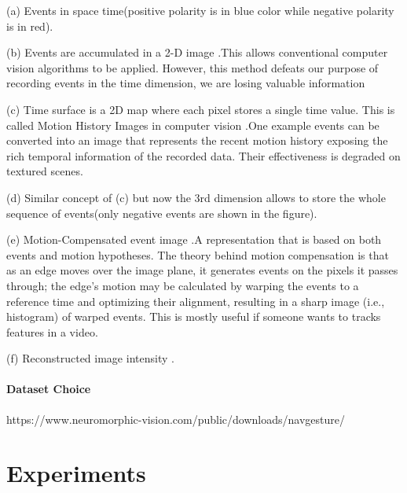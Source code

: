 \documentclass[12pt]{report}
\begin{document}
(a) Events in space time(positive polarity is in blue color while negative polarity is in red).

(b) Events are accumulated in a 2-D image .This allows conventional computer vision algorithms to be applied. However, this method defeats our purpose of recording events in the time dimension, we are losing valuable information

(c) Time surface is a 2D map where each pixel stores a single time value. This is called Motion History Images in computer vision \cite{ahad2012} .One example \cite{lagorge2017} events can be converted into an image that represents the recent motion history exposing the rich temporal information of the recorded data. Their effectiveness is degraded on textured scenes.

(d) Similar concept of (c) but now the 3rd dimension allows to store the whole sequence of events(only negative events are shown in the figure).

(e) Motion-Compensated event image \cite{Gallego2019} .A representation that is based on both events and motion hypotheses. The theory behind motion compensation is that as an edge moves over the image plane, it generates events on the pixels it passes through; the edge's motion may be calculated by warping the events to a reference time and optimizing their alignment, resulting in a sharp image (i.e., histogram) of warped events. This is mostly useful if someone wants to tracks features in a video.

(f) Reconstructed image intensity \cite{rebecq2019}.


\subsubsection{Dataset Choice}
https://www.neuromorphic-vision.com/public/downloads/navgesture/
\chapter{Experiments}


\end{document}
